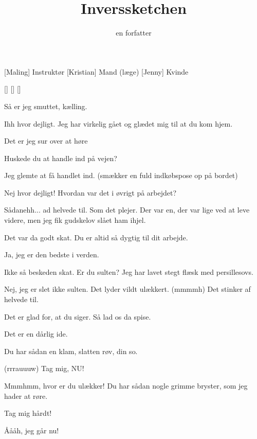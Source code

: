 \documentclass[a4paper,11pt]{article}
\title{Inverssketchen}
\author{en forfatter}
\begin{document}
\maketitle

\begin{roles}
[Maling] Instruktør
[Kristian] Mand (læge)
[Jenny] Kvinde
\end{roles}

\begin{props}
[]
[]
[]
\end{props}

\begin{sketch}

 Så er jeg smuttet, kælling.

 Ihh hvor dejligt. Jeg har virkelig gået og glædet mig til at du kom hjem.

 Det er jeg sur over at høre

 Huskede du at handle ind på vejen?

 Jeg glemte at få handlet ind. (smækker en fuld indkøbspose op på bordet)

 Nej hvor dejligt! Hvordan var det i øvrigt på arbejdet?

 Sådanehh... ad helvede til. Som det plejer. Der var en, der var lige ved at leve videre, men jeg fik gudskelov slået ham ihjel.

 Det var da godt skat. Du er altid så dygtig til dit arbejde.

 Ja, jeg er den bedste i verden.

 Ikke så beskeden skat. Er du sulten? Jeg har lavet stegt flæsk med persillesovs.

 Nej, jeg er slet ikke sulten. Det lyder vildt ulækkert. (mmmmh) Det stinker af helvede til.

 Det er glad for, at du siger. Så lad os da spise.

 Det er en dårlig ide.


 Du har sådan en klam, slatten røv, din so.

 (rrrauuuw) Tag mig, NU!

 Mmmhmm, hvor er du ulækker! Du har sådan nogle grimme bryster, som jeg hader at røre.


 Tag mig hårdt!

 Åååh, jeg går nu!

\end{sketch}
\end{document}
